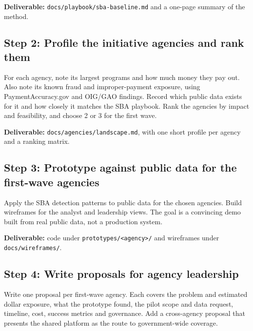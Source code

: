 \documentclass[letterpaper,11pt]{article}
\begin{document}
\textbf{Deliverable:} \texttt{docs/playbook/sba-baseline.md} and a
one-page summary of the method.

\hypertarget{step-2-profile-the-initiative-agencies-and-rank-them}{%
\subsection{Step 2: Profile the initiative agencies and rank
them}\label{step-2-profile-the-initiative-agencies-and-rank-them}}

For each agency, note its largest programs and how much money they pay
out. Also note its known fraud and improper-payment exposure, using
PaymentAccuracy.gov and OIG/GAO findings. Record which public data
exists for it and how closely it matches the SBA playbook. Rank the
agencies by impact and feasibility, and choose 2 or 3 for the first
wave.

\textbf{Deliverable:} \texttt{docs/agencies/landscape.md}, with one
short profile per agency and a ranking matrix.

\hypertarget{step-3-prototype-against-public-data-for-the-first-wave-agencies}{%
\subsection{Step 3: Prototype against public data for the first-wave
agencies}\label{step-3-prototype-against-public-data-for-the-first-wave-agencies}}

Apply the SBA detection patterns to public data for the chosen agencies.
Build wireframes for the analyst and leadership views. The goal is a
convincing demo built from real public data, not a production system.

\textbf{Deliverable:} code under
\texttt{prototypes/\textless{}agency\textgreater{}/} and wireframes
under \texttt{docs/wireframes/}.

\hypertarget{step-4-write-proposals-for-agency-leadership}{%
\subsection{Step 4: Write proposals for agency
leadership}\label{step-4-write-proposals-for-agency-leadership}}

Write one proposal per first-wave agency. Each covers the problem and
estimated dollar exposure, what the prototype found, the pilot scope and
data request, timeline, cost, success metrics and governance. Add a
cross-agency proposal that presents the shared platform as the route to
government-wide coverage.
\end{document}
